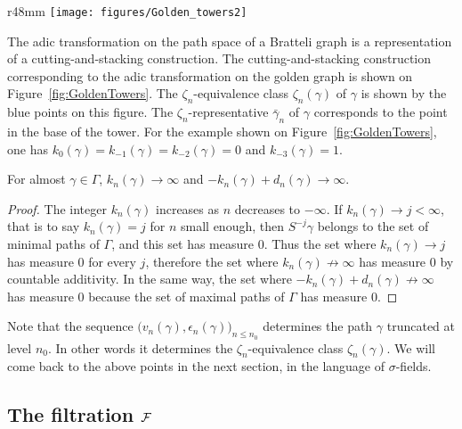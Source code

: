 \documentclass[12pt,a4paper]{article}
\begin{document}
\begin{wrapfigure}{r}{48mm}
   \centering
   	\texttt{[image: figures/Golden\_towers2]}
   \caption{Golden towers}
   \label{fig:GoldenTowers}
\end{wrapfigure}
The adic transformation on the path space of a Bratteli graph is 
a representation of a cutting-and-stacking construction. 
The cutting-and-stacking construction corresponding to 
the adic transformation on the golden graph is shown on
Figure~\ref{fig:GoldenTowers}. 
The $\zeta_n$-equivalence class $\zeta_n(\gamma)$ of 
$\gamma$ is shown by the blue points on this figure. 
The $\zeta_n$-representative $\bar\gamma_n$ of $\gamma$ 
corresponds to the point in the base of the tower. 
For the example shown on Figure~\ref{fig:GoldenTowers}, 
one has $k_0(\gamma)=k_{-1}(\gamma)=k_{-2}(\gamma)=0$ 
and $k_{-3}(\gamma)=1$. 




\begin{lemma}\label{lemma:infinitelimits}
For almost $\gamma \in \Gamma$, 
$k_n(\gamma) \to \infty$ and $-k_n(\gamma)+d_n(\gamma) \to \infty$.
\end{lemma}

\begin{proof}
The integer $k_n(\gamma)$ increases as $n$ decreases to $-\infty$. 
If $k_n(\gamma) \to j < \infty$, that is to say $k_n(\gamma)=j$ for $n$ small 
enough, then $S^{-j}\gamma$ belongs to the set of minimal paths 
of $\Gamma$, and this set has measure $0$. 
Thus the set where $k_n(\gamma) \to j$ has measure $0$ for every $j$, 
therefore the set where $k_n(\gamma) \not\to \infty$ has measure $0$ 
by countable additivity. 
In the same way, the set where $-k_n(\gamma)+d_n(\gamma) \not\to \infty$ 
has measure $0$ because the set of maximal paths of $\Gamma$ has measure $0$.
\end{proof}

 
Note that the sequence $\bigl(v_n(\gamma), \epsilon_n(\gamma)\bigr)_{n \leq n_0}$  
 determines the path $\gamma$ truncated at level $n_0$. 
In other words it determines the $\zeta_{n}$-equivalence class  
$\zeta_n(\gamma)$. 
We will come back to the above points in the next section, in the 
language of $\sigma$-fields. 



\subsection{The filtration $\mathcal{F}$}
\end{document}
